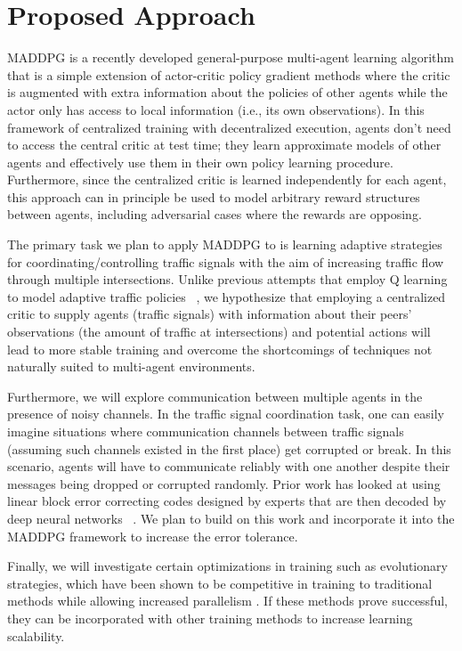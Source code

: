 
\section{Proposed Approach}
\label{sec:direction}

MADDPG is a recently developed general-purpose multi-agent learning algorithm that is a simple extension of actor-critic policy gradient methods where the critic is augmented with extra information about the policies of other agents while the actor only has access to local information (i.e., its own observations). In this framework of centralized training with decentralized execution, agents don’t need to access the central critic at test time; they learn approximate models of other agents and effectively use them in their own policy learning procedure. Furthermore, since the centralized critic is learned independently for each agent, this approach can in principle be used to model arbitrary reward structures between agents, including adversarial cases where the rewards are opposing. 

The primary task we plan to apply MADDPG to is learning adaptive strategies for coordinating/controlling traffic signals with the aim of increasing traffic flow through multiple intersections. Unlike previous attempts that employ Q learning to model adaptive traffic policies ~\cite{araghi2015traffic}, we hypothesize that employing a centralized critic to supply agents (traffic signals) with information about their peers’ observations (the amount of traffic at intersections) and potential actions will lead to more stable training and overcome the shortcomings of techniques not naturally suited to multi-agent environments. 

Furthermore, we will explore communication between multiple agents in the presence of noisy channels. In the traffic signal coordination task, one can easily imagine situations where communication channels between traffic signals (assuming such channels existed in the first place) get corrupted or break. In this scenario, agents will have to communicate reliably with one another despite their messages being dropped or corrupted randomly. Prior work has looked at using linear block error correcting codes designed by experts that are then decoded by deep neural networks ~\cite{nachmani2016learning, nachmani2017rnn}. We plan to build on this work and incorporate it into the MADDPG framework to increase the error tolerance.

Finally, we will investigate certain optimizations in training such as evolutionary strategies, which have been shown to be competitive in training to traditional methods while allowing increased parallelism \cite{salimans2017evolution}.
If these methods prove successful, they can be incorporated with other training methods to increase learning scalability.


